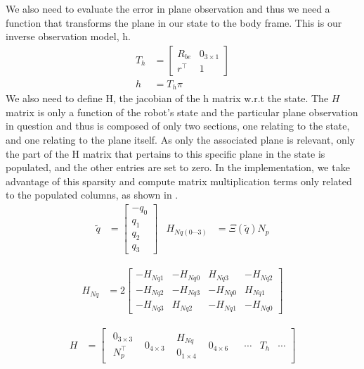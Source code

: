 \documentclass[]{article}
\begin{document}
{We also need to evaluate the error in plane observation and thus we need a function that transforms the plane in our state to the body frame. This is our inverse observation model, h.
\begin{align}
	T_h &= 
	\left[
	\begin{matrix}
		R_{be} 	& 0_{3\times1} \\
		r^\top 	& 1
	\end{matrix}
	\right]
	\\
	h &= T_h \pi
\end{align}
We also need to define H, the jacobian of the h matrix w.r.t the state. The $H$ matrix is only a function of the robot's state and the particular plane observation in question and thus is composed of only two sections, one relating to the state, and one relating to the plane itself. As only the associated plane is relevant, only the part of the H matrix that pertains to this specific plane in the state is populated, and the other entries are set to zero.
In the implementation, we take advantage of this sparsity and compute matrix multiplication terms only related to the populated columns, as shown in \cite{Sola2013}.
\begin{align}
	\tilde{q} &= 
	\left[
	\begin{matrix}
		-q_0 \\
		q_1 \\
		q_2 \\
		q_3
	\end{matrix}
	\right]
	&
	H_{Nq(0\cdots3)} &= \Xi(\tilde{q}) N_p
\end{align}

\begin{align}
	H_{Nq} &= 2
	\left[
	\begin{matrix}
		-H_{Nq1} 	& -H_{Nq0} 	& H_{Nq3} 	& -H_{Nq2} \\
		-H_{Nq2} 	& -H_{Nq3} 	& -H_{Nq0} 	& H_{Nq1} \\
		-H_{Nq3} 	& H_{Nq2} 	& -H_{Nq1} 	& -H_{Nq0}
	\end{matrix}
	\right]
\end{align}

\begin{align}
	H &=
	\left[
	\begin{matrix}
		\begin{matrix}
			0_{3 \times 3} \\
			N_p^\top
		\end{matrix}
		& 0_{4 \times 3}
		&
		\begin{matrix}
			H_{Nq} \\
			0_{1 \times 4}
		\end{matrix}
		& 0_{4 \times 6}
		&
		& \cdots
		& T_h
		& \cdots
	\end{matrix}
	\right]
\end{align}

}
\end{document}

